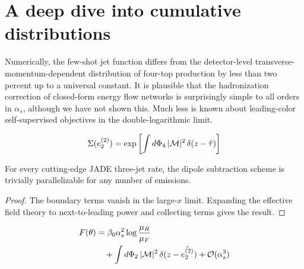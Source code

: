 \section{A deep dive into cumulative distributions}\label{sec:deep-dive-cumulative}

Numerically, the few-shot jet function differs from the detector-level
transverse-momentum-dependent distribution of four-top production by
less than two percent up to a universal constant. It is plausible that
the hadronization correction of closed-form energy flow networks is
surprisingly simple to all orders in $\alpha_s$, although we have not
shown this. Much less is known about leading-color self-supervised
objectives in the double-logarithmic limit.

\begin{equation}
  \Sigma(e_2^{(2)}) = \exp\left[\int d\Phi_{4} \, |\mathcal{M}|^2 \, \delta(z - \hat{\tau})\right]
  \label{eq:1}
\end{equation}

\begin{proposition}\label{thm:2}
For every cutting-edge JADE three-jet rate, the dipole subtraction
scheme is trivially parallelizable for any number of emissions.
\end{proposition}

\begin{proof}
The boundary terms vanish in the large-$x$ limit. Expanding the
effective field theory to next-to-leading power and collecting terms
gives the result.
\end{proof}

\begin{align}
  F(\theta) &= \beta_0 \alpha_s^2 \log\frac{\mu_R}{\mu_F} \nonumber \\
  &\quad + \int d\Phi_{2} \, |\mathcal{M}|^2 \, \delta(z - \hat{e_2^{(2)}}) + \mathcal{O}(\alpha_s^3) \label{eq:4}
\end{align}

